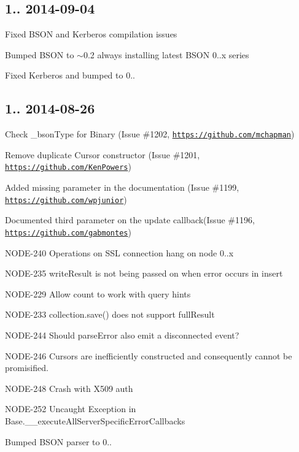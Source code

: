 \subsection*{1.. 2014-\/09-\/04 }


\begin{DoxyItemize}
\item Fixed B\+S\+ON and Kerberos compilation issues
\item Bumped B\+S\+ON to $\sim$0.2 always installing latest B\+S\+ON 0..\+x series
\item Fixed Kerberos and bumped to 0..
\end{DoxyItemize}

\subsection*{1.. 2014-\/08-\/26 }


\begin{DoxyItemize}
\item Check \+\_\+bson\+Type for Binary (Issue \#1202, \href{https://github.com/mchapman}{\tt https\+://github.\+com/mchapman})
\item Remove duplicate Cursor constructor (Issue \#1201, \href{https://github.com/KenPowers}{\tt https\+://github.\+com/\+Ken\+Powers})
\item Added missing parameter in the documentation (Issue \#1199, \href{https://github.com/wpjunior}{\tt https\+://github.\+com/wpjunior})
\item Documented third parameter on the update callback(Issue \#1196, \href{https://github.com/gabmontes}{\tt https\+://github.\+com/gabmontes})
\item N\+O\+D\+E-\/240 Operations on S\+SL connection hang on node 0..\+x
\item N\+O\+D\+E-\/235 write\+Result is not being passed on when error occurs in insert
\item N\+O\+D\+E-\/229 Allow count to work with query hints
\item N\+O\+D\+E-\/233 collection.\+save() does not support full\+Result
\item N\+O\+D\+E-\/244 Should parse\+Error also emit a {\ttfamily disconnected} event?
\item N\+O\+D\+E-\/246 Cursors are inefficiently constructed and consequently cannot be promisified.
\item N\+O\+D\+E-\/248 Crash with X509 auth
\item N\+O\+D\+E-\/252 Uncaught Exception in Base.\+\_\+\+\_\+execute\+All\+Server\+Specific\+Error\+Callbacks
\item Bumped B\+S\+ON parser to 0..
\end{DoxyItemize}

